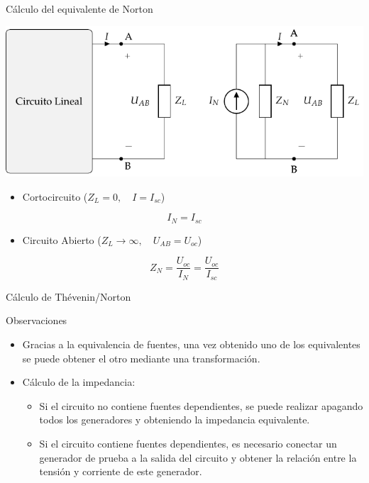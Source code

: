 \documentclass[xcolor={usenames,svgnames,dvipsnames}]{beamer}
\begin{document}
\begin{frame}[label={sec:orgc294503}]{Cálculo del equivalente de Norton}
\begin{center}
\includegraphics[width=.9\linewidth]{figs/EquivalenteNorton.pdf}
\end{center}

\begin{itemize}
\item Cortocircuito (\(Z_L = 0, \quad I = I_{sc}\))
\end{itemize}
\[
\boxed{I_N = I_{sc}}
\]
\begin{itemize}
\item Circuito Abierto (\(Z_L \to \infty, \quad U_{AB} = U_{oc}\))
\end{itemize}
\[
\boxed{Z_N = \frac{U_{oc}}{I_N} = \frac{U_{oc}}{I_{sc}}}
\]
\end{frame}

\begin{frame}[label={sec:org78cdbf6}]{Cálculo de Thévenin/Norton}
\begin{block}{Observaciones}
\begin{itemize}
\item Gracias a la equivalencia de fuentes, una vez obtenido uno de los equivalentes se puede obtener el otro mediante una transformación.
\item Cálculo de la impedancia:
\begin{itemize}
\item Si el circuito \alert{no} contiene fuentes dependientes, se puede realizar \alert{apagando} todos los \alert{generadores} y obteniendo la impedancia equivalente.
\item Si el circuito contiene fuentes dependientes, es necesario conectar un \alert{generador de prueba} a la salida del circuito y obtener la relación entre la tensión y corriente de este generador.
\end{itemize}
\end{itemize}
\end{block}
\end{frame}
\end{document}
